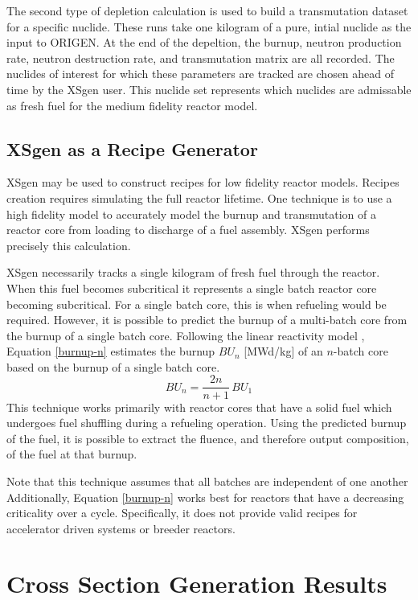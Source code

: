 \documentclass{article}
\begin{document}
The second type of depletion calculation is used to build a transmutation dataset for a
specific nuclide. These runs take one kilogram of a pure, intial nuclide as the input to
ORIGEN. At the end of the depeltion, the burnup, neutron production rate, neutron
destruction rate, and transmutation matrix are all recorded. The nuclides of interest
for which these parameters are tracked are chosen ahead of time by the XSgen user.
This nuclide set represents which nuclides are admissable as fresh fuel for the medium
fidelity reactor model.

\subsection{XSgen as a Recipe Generator}
\label{sec:recipe}
XSgen may be used to construct recipes for low fidelity reactor models. Recipes creation
requires simulating the full reactor lifetime. One technique is to use a high fidelity
model to accurately model the burnup and transmutation of a reactor core from loading to
discharge of a fuel assembly. XSgen performs precisely this calculation.

XSgen necessarily tracks a single kilogram of fresh fuel through the reactor. When this
fuel becomes subcritical it represents a single batch reactor core becoming subcritical.
For a single batch core, this is when refueling would be required. However, it is possible
to predict the burnup of a multi-batch core from the burnup of a single batch core.
Following the linear reactivity model \cite{linear}, Equation \ref{burnup-n} estimates the burnup
$BU_n$ [MWd/kg] of an $n$-batch core based on the burnup of a single batch core.
\begin{equation}
\label{burnup-n}
BU_n = \frac{2n}{n+1} \, BU_1
\end{equation}
This technique works primarily with reactor cores that have a solid fuel which undergoes
fuel shuffling during a refueling operation. Using the predicted burnup of the fuel,
it is possible to extract the fluence, and therefore output composition,
of the fuel at that burnup\cite{brightlite}\cite{linear}. 

Note that this technique assumes that all batches are independent of one another
Additionally, Equation \ref{burnup-n} works best for reactors that have a decreasing
criticality over a cycle. Specifically, it does not provide valid recipes for accelerator
driven systems or breeder reactors.

\section{Cross Section Generation Results}
\end{document}
